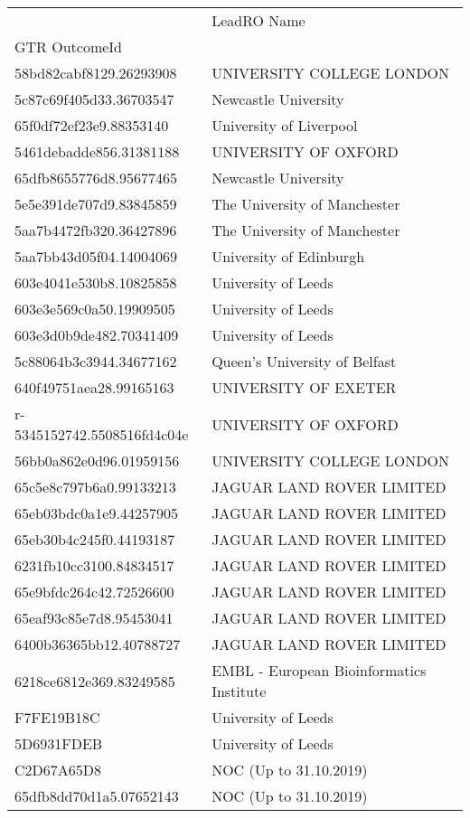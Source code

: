 \begin{tabular}{ll}
\toprule
 & LeadRO Name \\
GTR OutcomeId &  \\
\midrule
58bd82cabf8129.26293908 & UNIVERSITY COLLEGE LONDON \\
5c87c69f405d33.36703547 & Newcastle University \\
65f0df72ef23e9.88353140 & University of Liverpool \\
5461debadde856.31381188 & UNIVERSITY OF OXFORD \\
65dfb8655776d8.95677465 & Newcastle University \\
5e5e391de707d9.83845859 & The University of Manchester \\
5aa7b4472fb320.36427896 & The University of Manchester \\
5aa7bb43d05f04.14004069 & University of Edinburgh \\
603e4041e530b8.10825858 & University of Leeds \\
603e3e569c0a50.19909505 & University of Leeds \\
603e3d0b9de482.70341409 & University of Leeds \\
5c88064b3c3944.34677162 & Queen's University of Belfast \\
640f49751aea28.99165163 & UNIVERSITY OF EXETER \\
r-5345152742.5508516fd4c04e & UNIVERSITY OF OXFORD \\
56bb0a862e0d96.01959156 & UNIVERSITY COLLEGE LONDON \\
65c5e8c797b6a0.99133213 & JAGUAR LAND ROVER LIMITED \\
65eb03bdc0a1e9.44257905 & JAGUAR LAND ROVER LIMITED \\
65eb30b4c245f0.44193187 & JAGUAR LAND ROVER LIMITED \\
6231fb10cc3100.84834517 & JAGUAR LAND ROVER LIMITED \\
65e9bfdc264c42.72526600 & JAGUAR LAND ROVER LIMITED \\
65eaf93c85e7d8.95453041 & JAGUAR LAND ROVER LIMITED \\
6400b36365bb12.40788727 & JAGUAR LAND ROVER LIMITED \\
6218ce6812e369.83249585 & EMBL - European Bioinformatics Institute \\
F7FE19B18C & University of Leeds \\
5D6931FDEB & University of Leeds \\
C2D67A65D8 & NOC (Up to 31.10.2019) \\
65dfb8dd70d1a5.07652143 & NOC (Up to 31.10.2019) \\

\end{tabular}

